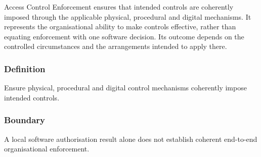 Access Control Enforcement ensures that intended controls are coherently imposed through the applicable physical, procedural and digital mechanisms. It represents the organisational ability to make controls effective, rather than equating enforcement with one software decision. Its outcome depends on the controlled circumstances and the arrangements intended to apply there.

\subsubsection*{Definition}

Ensure physical, procedural and digital control mechanisms coherently impose intended controls.

\subsubsection*{Boundary}

A local software authorisation result alone does not establish coherent end-to-end organisational enforcement.

